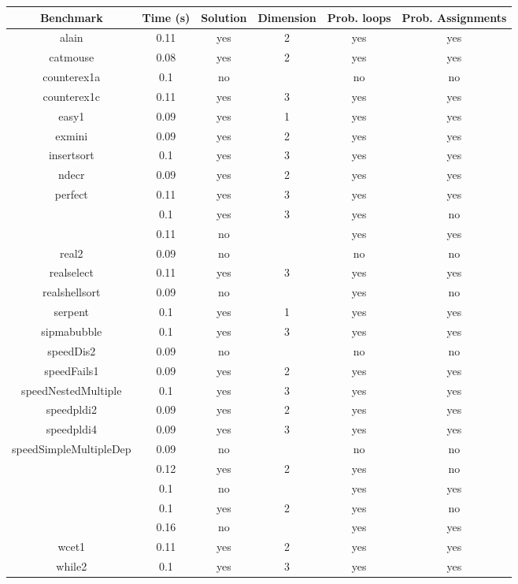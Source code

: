 \begin{center}
\begin{table}[]
  \centering
   \begin{tabular}{c|c|c|c|c|c}
    
{Benchmark} & {Time (s)} & {Solution} & {Dimension} & {Prob. loops} & {Prob. Assignments} \\\hline \hline
{alain} & {0.11} & {yes} & {2} & {yes} & {yes} \\\hline
{catmouse} & {0.08} & {yes} & {2} & {yes} & {yes} \\\hline
{counterex1a} & {0.1} & {no} & {} & {no} & {no} \\\hline
{counterex1c} & {0.11} & {yes} & {3} & {yes} & {yes} \\\hline
{easy1} & {0.09} & {yes} & {1} & {yes} & {yes} \\\hline
{exmini} & {0.09} & {yes} & {2} & {yes} & {yes} \\\hline
{insertsort} & {0.1} & {yes} & {3} & {yes} & {yes} \\\hline
{ndecr} & {0.09} & {yes} & {2} & {yes} & {yes} \\\hline
{perfect} & {0.11} & {yes} & {3} & {yes} & {yes} \\\hline
{\multirow{2}{*}{perfect2}} & {0.1} & {yes} & {3} & {yes} & {no} \\\cline{2-6}
{} & {0.11} & {no} & {} & {yes} & {yes} \\\hline
{real2} & {0.09} & {no} & {} & {no} & {no} \\\hline
{realselect} & {0.11} & {yes} & {3} & {yes} & {yes} \\\hline
{realshellsort} & {0.09} & {no} & {} & {yes} & {no} \\\hline
{serpent} & {0.1} & {yes} & {1} & {yes} & {yes} \\\hline
{sipmabubble} & {0.1} & {yes} & {3} & {yes} & {yes} \\\hline
{speedDis2} & {0.09} & {no} & {} & {no} & {no} \\\hline
{speedFails1} & {0.09} & {yes} & {2} & {yes} & {yes} \\\hline
{speedNestedMultiple} & {0.1} & {yes} & {3} & {yes} & {yes} \\\hline
{speedpldi2} & {0.09} & {yes} & {2} & {yes} & {yes} \\\hline
{speedpldi4} & {0.09} & {yes} & {3} & {yes} & {yes} \\\hline
{speedSimpleMultipleDep} & {0.09} & {no} & {} & {no} & {no} \\\hline
{\multirow{2}{*}{speedSingleSingle2}} & {0.12} & {yes} & {2} & {yes} & {no} \\\cline{2-6}
{} & {0.1} & {no} & {} & {yes} & {yes} \\\hline
{\multirow{2}{*}{unperfect}} & {0.1} & {yes} & {2} & {yes} & {no} \\\cline{2-6}
{} & {0.16} & {no} & {} & {yes} & {yes} \\\hline
{wcet1} & {0.11} & {yes} & {2} & {yes} & {yes} \\\hline
{while2} & {0.1} & {yes} & {3} & {yes} & {yes} \\\hline
    

\end{tabular}
\end{table}
\end{center}
